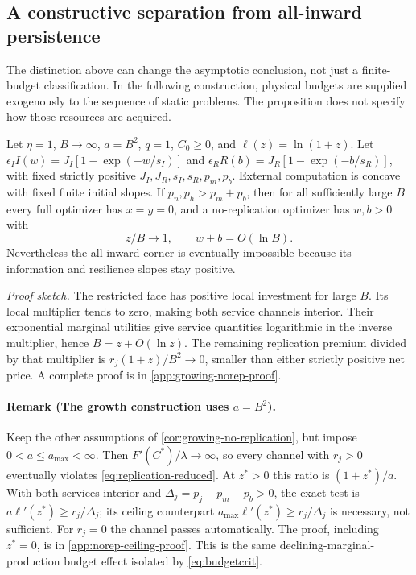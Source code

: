 \subsection{A constructive separation from all-inward persistence}
The distinction above can change the asymptotic conclusion, not just a
finite-budget classification. In the following construction, physical
budgets are supplied exogenously to the sequence of static problems.
The proposition does not specify how those resources are acquired.

\begin{corollary}
\label{cor:growing-no-replication}
Let $\eta=1$, $B\to\infty$, $a=B^2$, $q=1$, $C_0\geq0$, and
$\ell(z)=\ln(1+z)$. Let
$\epsilon_I I(w)=J_I[1-\exp(-w/s_I)]$ and
$\epsilon_R R(b)=J_R[1-\exp(-b/s_R)]$, with fixed strictly positive
$J_I,J_R,s_I,s_R,p_m,p_b$. External computation is concave with fixed
finite initial slopes. If $p_n,p_h>p_m+p_b$, then for all sufficiently
large $B$ every full optimizer has $x=y=0$, and a no-replication optimizer
has $w,b>0$ with
\[
 z/B\longrightarrow1,\qquad w+b=O(\ln B).
\]
Nevertheless the all-inward corner is eventually impossible because its
information and resilience slopes stay positive.
\end{corollary}
\noindent\emph{Proof sketch.}
The restricted face has positive local investment for large $B$.
Its local multiplier tends to zero, making both service channels interior.
Their exponential marginal utilities give service quantities logarithmic
in the inverse multiplier, hence $B=z+O(\ln z)$. The remaining replication
premium divided by that multiplier is $r_j(1+z)/B^2\to0$, smaller than
either strictly positive net price. A complete proof is in
\cref{app:growing-norep-proof}.

\paragraph{Remark (The growth construction uses $a=B^2$).}
Keep the other assumptions of \cref{cor:growing-no-replication}, but
impose $0<a\leq a_{\max}<\infty$. Then $F'(C^*)/\lambda\to\infty$,
so every channel with $r_j>0$ eventually violates
\cref{eq:replication-reduced}. At $z^*>0$ this ratio is $(1+z^*)/a$.
With both services interior and $\Delta_j=p_j-p_m-p_b>0$, the exact test is
$a\ell'(z^*)\geq r_j/\Delta_j$; its ceiling counterpart
$a_{\max}\ell'(z^*)\geq r_j/\Delta_j$ is necessary, not sufficient.
For $r_j=0$ the channel passes automatically. The proof, including $z^*=0$,
is in \cref{app:norep-ceiling-proof}. This is the same declining-marginal-production
budget effect isolated by \cref{eq:budgetcrit}.

